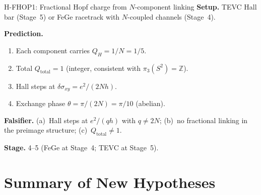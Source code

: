 \documentclass[11pt,letterpaper]{article}
\newcommand{\Qhopf}{Q_H}
\begin{document}
\begin{hypothesis}{H-FHOP1: Fractional Hopf charge from $N$-component linking}
\textbf{Setup.}  TEVC Hall bar (Stage~5) or FeGe racetrack with $N$-coupled channels (Stage~4).

\textbf{Prediction.}
\begin{enumerate}[nosep]
  \item Each component carries $\Qhopf = 1/N = 1/5$.
  \item Total $Q_{\mathrm{total}} = 1$ (integer, consistent with $\pi_3(S^2) = \mathbb{Z}$).
  \item Hall steps at $\delta\sigma_{xy} = e^2/(2Nh)$.
  \item Exchange phase $\theta = \pi/(2N) = \pi/10$ (abelian).
\end{enumerate}

\textbf{Falsifier.}  (a)~Hall steps at $e^2/(qh)$ with $q \neq 2N$; (b)~no fractional linking in the preimage structure; (c)~$Q_{\mathrm{total}} \neq 1$.

\textbf{Stage.}  4--5 (FeGe at Stage~4; TEVC at Stage~5).
\end{hypothesis}


\section{Summary of New Hypotheses}\label{sec:summary}
\end{document}
